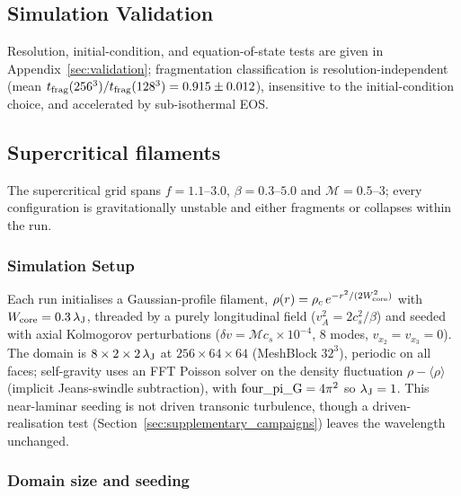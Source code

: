 \documentclass[usenatbib,twoside,twocolumn]{mnras}
\begin{document}
\subsection{Simulation Validation}

Resolution, initial-condition, and equation-of-state tests are given in Appendix~\ref{sec:validation}; fragmentation classification is resolution-independent (mean $t_{\rm frag}(256^3)/t_{\rm frag}(128^3)=0.915\pm0.012$), insensitive to the initial-condition choice, and accelerated by sub-isothermal EOS.


\subsection{Supercritical filaments}
\label{sec:supercrit}

The supercritical grid spans $f=1.1$--$3.0$, $\beta=0.3$--$5.0$ and $\mathcal{M}=0.5$--$3$; every configuration is gravitationally unstable and either fragments or collapses within the run.

\subsubsection{Simulation Setup}

Each run initialises a Gaussian-profile filament, $\rho(r)=\rho_c\,e^{-r^2/(2W_{\rm core}^2)}$ with $W_{\rm core}=0.3\,\lambda_{\rm J}$, threaded by a purely longitudinal field ($v_A^2=2c_s^2/\beta$) and seeded with axial Kolmogorov perturbations ($\delta v=\mathcal{M}c_s\times10^{-4}$, 8 modes, $v_{x_2}=v_{x_3}=0$). The domain is $8\times2\times2\,\lambda_{\rm J}$ at $256\times64\times64$ (MeshBlock $32^3$), periodic on all faces; self-gravity uses an FFT Poisson solver on the density fluctuation $\rho-\langle\rho\rangle$ (implicit Jeans-swindle subtraction), with ${\rm four\_pi\_G}=4\pi^2$ so $\lambda_{\rm J}=1$. This near-laminar seeding is not driven transonic turbulence, though a driven-realisation test (Section~\ref{sec:supplementary_campaigns}) leaves the wavelength unchanged.

\subsubsection{Domain size and seeding}
\end{document}
